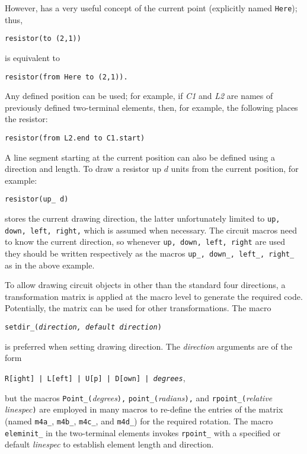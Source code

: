 \noindent
However, \pic has a very useful concept of the current point (explicitly
named {\tt Here}); thus,
\par
{\tt resistor(to (2,1))}
\par
\noindent
is equivalent to
\par
{\tt resistor(from Here to (2,1)).}

Any defined position can be used; for example, if {\sl C1} and {\sl L2}
are names of previously defined two-terminal elements,
then, for example, the following places the resistor: 
\par
{\tt resistor(from L2.end to C1.start)}

A line segment starting at the current position can also be defined using
a direction and length.
To draw a resistor up $d$ units from the current position, for example:
\par
{\tt resistor(up\_ d)}

\Pic stores the current drawing direction,
the latter unfortunately limited to {\tt up, down, left, right,}
which is assumed when necessary.
The circuit macros need to know the current direction, so
whenever {\tt up, down, left, right} are used they should be written
respectively as the macros {\tt up\_, down\_, left\_, right\_} as in
the above example.

To allow drawing circuit objects in other than the standard four directions,
a transformation matrix
is applied at the macro level to generate the required \pic code.
Potentially, the matrix can be used for other transformations.
The macro

{\tt setdir\_({\sl direction, default direction})}

\noindent
is preferred when setting drawing direction.  The {\sl direction} arguments
are of the form

{\tt R[ight] | L[eft] | U[p] | D[own] | {\sl degrees}},

\noindent
but the macros
{\tt Point\_(}{\sl degrees}{\tt ),}
{\tt point\_(}{\sl radians}{\tt ),}
and {\tt rpoint\_(}{\sl relative linespec}{\tt )} are employed in many macros
to re-define the entries
of the matrix
(named {\tt m4a\_}, {\tt m4b\_}, {\tt m4c\_}, and {\tt m4d\_})
for the required rotation.
The macro {\tt eleminit\_} in the two-terminal elements invokes
{\tt rpoint\_} with a specified or default {\sl linespec}
to establish element length and direction.

